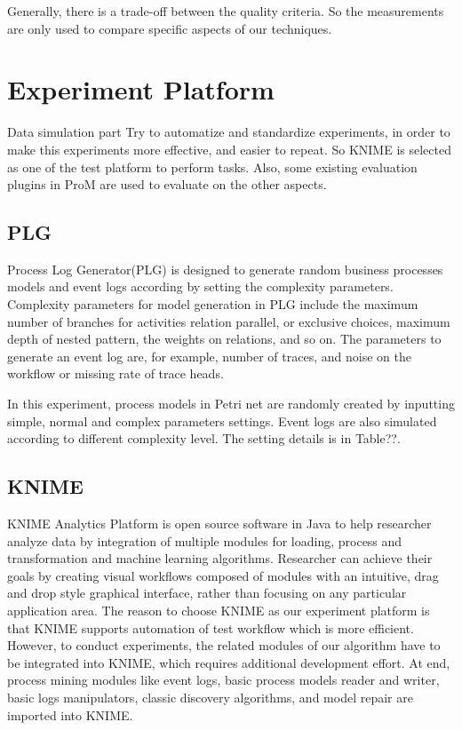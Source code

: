 Generally, there is a trade-off between the quality criteria. So the measurements are only used to compare specific aspects of our techniques.
\section{Experiment Platform}
Data simulation part
Try to automatize and standardize experiments, in order to make this experiments more effective, and easier to repeat. So KNIME is selected as one of the test platform to perform tasks. Also, some existing evaluation plugins in ProM are used to evaluate on the other aspects.

\subsection{PLG}
Process Log Generator(PLG) is designed to generate random business processes models and event logs according by setting the complexity parameters. Complexity parameters for model generation in PLG include the maximum number of branches for activities relation parallel, or exclusive choices,  maximum depth of nested pattern, the weights on relations, and so on. The parameters to generate an event log are, for example, number of traces, and noise on the workflow or missing rate of trace heads. 

In this experiment, process models in Petri net are randomly created by inputting simple, normal and complex parameters settings. Event logs are also simulated according to different complexity level. The setting details is in Table??. 
\subsection{KNIME}
KNIME Analytics Platform is open source software in Java to help researcher analyze data by integration of multiple modules for loading, process and transformation and machine learning algorithms. Researcher can achieve their goals by creating visual workflows composed of modules with an intuitive, drag and drop style graphical interface, rather than focusing on any particular application area. 
The reason to choose KNIME as our experiment platform is that KNIME supports automation of test workflow which is more efficient.  
However, to conduct experiments, the related modules of our algorithm have to be integrated into KNIME, which requires additional development effort. At end, process mining modules like event logs, basic process models reader and writer, basic logs manipulators, classic discovery algorithms, and model repair are imported into KNIME.
